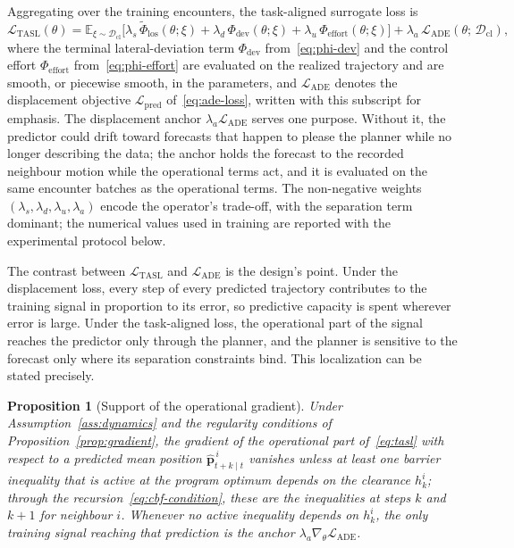 \documentclass[11pt]{article}
\theoremstyle{plain}
\newtheorem{proposition}{Proposition}
\theoremstyle{definition}
\newcommand{\E}{\mathbb{E}}
\begin{document}
Aggregating over the training encounters, the task-aligned surrogate
loss is
\begin{equation}
	\label{eq:tasl}
	\mathcal{L}_{\mathrm{TASL}}(\theta)
	= \E_{\xi \sim \mathcal{D}_{\mathrm{cl}}}\!\Big[
		\lambda_{s}\, \widetilde\Phi_{\mathrm{los}}(\theta; \xi)
		+ \lambda_{d}\, \Phi_{\mathrm{dev}}(\theta; \xi)
		+ \lambda_{u}\, \Phi_{\mathrm{effort}}(\theta; \xi)
		\Big]
	+ \lambda_{a}\, \mathcal{L}_{\mathrm{ADE}}(\theta;\, \mathcal{D}_{\mathrm{cl}}),
\end{equation}
where the terminal lateral-deviation term $\Phi_{\mathrm{dev}}$
from~\eqref{eq:phi-dev} and the control effort
$\Phi_{\mathrm{effort}}$ from~\eqref{eq:phi-effort} are evaluated on
the realized trajectory and are smooth, or piecewise smooth, in the
parameters, and $\mathcal{L}_{\mathrm{ADE}}$ denotes the displacement
objective $\mathcal{L}_{\mathrm{pred}}$ of~\eqref{eq:ade-loss},
written with this subscript for emphasis. The displacement anchor $\lambda_a
	\mathcal{L}_{\mathrm{ADE}}$ serves one purpose. Without it, the
predictor could drift toward forecasts that happen to please the
planner while no longer describing the data; the anchor holds the
forecast to the recorded neighbour motion while the operational terms
act, and it is evaluated on the same encounter batches as the
operational terms. The non-negative weights
$(\lambda_s, \lambda_d, \lambda_u, \lambda_a)$ encode the operator's
trade-off, with the separation term dominant; the numerical values used in training are reported with the
experimental protocol below.
 
The contrast between $\mathcal{L}_{\mathrm{TASL}}$ and
$\mathcal{L}_{\mathrm{ADE}}$ is the design's point. Under the
displacement loss, every step of every predicted trajectory
contributes to the training signal in proportion to its error, so
predictive capacity is spent wherever error is large. Under the
task-aligned loss, the operational part of the signal reaches the
predictor only through the planner, and the planner is sensitive to
the forecast only where its separation constraints bind. This
localization can be stated precisely.
 
\begin{proposition}[Support of the operational gradient]
	\label{prop:gradient-support}
	Under Assumption~\ref{ass:dynamics} and the regularity conditions
	of Proposition~\ref{prop:gradient}, the gradient of the operational
	part of~\eqref{eq:tasl} with respect to a predicted mean position
	$\hat{\bm{p}}^{\,i}_{t+k \mid t}$ vanishes unless at least one
	barrier inequality that is active at the program optimum depends on
	the clearance $h^{i}_{k}$; through the
	recursion~\eqref{eq:cbf-condition}, these are the inequalities at
	steps $k$ and $k+1$ for neighbour $i$. Whenever no active
	inequality depends on $h^{i}_{k}$, the only training signal
	reaching that prediction is the anchor
	$\lambda_a \nabla_\theta \mathcal{L}_{\mathrm{ADE}}$.
\end{proposition}
 
\end{document}
